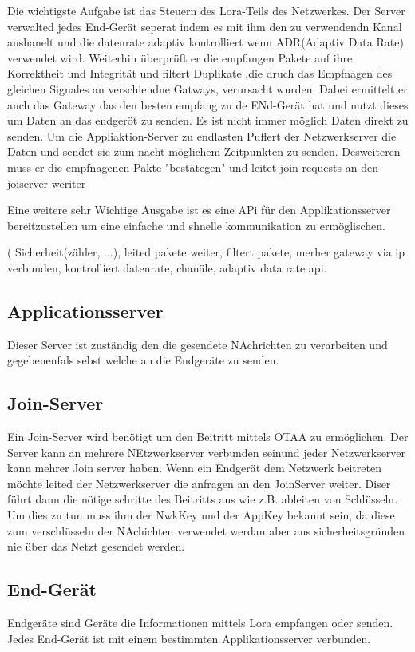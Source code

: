 \documentclass[a4paper,12pt]{article}
\begin{document}
            Die wichtigste Aufgabe ist das Steuern des Lora-Teils des Netzwerkes. Der Server verwalted jedes End-Gerät seperat indem es mit ihm den zu verwendendn Kanal aushanelt und die datenrate adaptiv kontrolliert wenn ADR(Adaptiv Data Rate) verwendet wird.
            Weiterhin überprüft er die empfangen Pakete auf ihre Korrektheit und Integrität und filtert Duplikate ,die druch das Empfnagen des gleichen Signales an verschiendne Gatways, verursacht wurden. Dabei ermittelt er auch das Gateway das den besten empfang zu de ENd-Gerät hat und nutzt dieses um Daten an das endgeröt zu senden.
            Es ist nicht immer möglich Daten direkt zu senden. Um die Appliaktion-Server zu endlasten Puffert der Netzwerkserver die Daten und sendet sie zum nächt möglichem Zeitpunkten zu senden.
            Desweiteren muss er die empfnagenen Pakte "bestätegen" und leitet join requests an den joiserver weriter

            Eine weitere sehr Wichtige Ausgabe ist es eine APi für den Applikationsserver bereitzustellen um eine einfache und shnelle kommunikation zu ermöglischen.
            
            \cite{LoRaSpec}( Sicherheit(zähler, ...), leited pakete weiter, filtert pakete, merher gateway via ip verbunden, kontrolliert datenrate, chanäle, adaptiv data rate api.
        \subsection{Applicationsserver}
            Dieser Server ist zuständig den die gesendete NAchrichten zu verarbeiten und gegebenenfals sebst welche an die Endgeräte zu senden.
        \subsection{Join-Server}
            Ein Join-Server wird benötigt um den Beitritt mittels OTAA zu ermöglichen. Der Server kann an mehrere NEtzwerkserver verbunden seinund jeder Netzwerkserver kann mehrer Join server haben.
            Wenn ein Endgerät dem Netzwerk beitreten möchte leited der Netzwerkserver die anfragen an den JoinServer weiter. Diser führt dann die nötige schritte des Beitritts aus wie z.B. ableiten von Schlüsseln.
            Um dies zu tun muss ihm der NwkKey und der AppKey bekannt sein, da diese zum verschlüsseln der NAchichten verwendet werdan aber aus sicherheitsgründen nie über das Netzt gesendet werden.
        \subsection{End-Gerät}
            Endgeräte sind Geräte die Informationen mittels Lora empfangen oder senden. Jedes End-Gerät ist mit einem bestimmten Applikationsserver verbunden.
            
\end{document}
